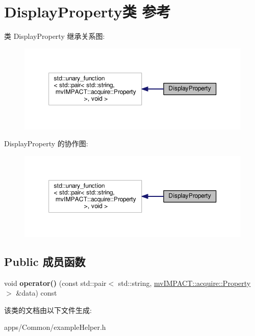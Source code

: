 \hypertarget{class_display_property}{\section{Display\+Property类 参考}
\label{class_display_property}
}


类 Display\+Property 继承关系图\+:
\nopagebreak
\begin{figure}[H]
\begin{center}
\leavevmode
\includegraphics[width=350pt]{class_display_property__inherit__graph}
\end{center}
\end{figure}


Display\+Property 的协作图\+:
\nopagebreak
\begin{figure}[H]
\begin{center}
\leavevmode
\includegraphics[width=350pt]{class_display_property__coll__graph}
\end{center}
\end{figure}
\subsection*{Public 成员函数}
\begin{DoxyCompactItemize}
\item 
\hypertarget{class_display_property_a3e69cdbe4f21d0b0a6e6951e75befc72}{void {\bfseries operator()} (const std\+::pair$<$ std\+::string, \hyperlink{classmv_i_m_p_a_c_t_1_1acquire_1_1_property}{mv\+I\+M\+P\+A\+C\+T\+::acquire\+::\+Property} $>$ \&data) const }\label{class_display_property_a3e69cdbe4f21d0b0a6e6951e75befc72}

\end{DoxyCompactItemize}


该类的文档由以下文件生成\+:\begin{DoxyCompactItemize}
\item 
apps/\+Common/example\+Helper.\+h\end{DoxyCompactItemize}
